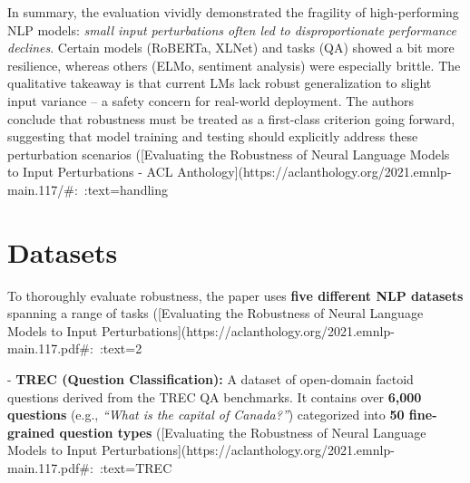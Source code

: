 In summary, the evaluation vividly demonstrated the fragility of high-performing NLP models: \textit{small input perturbations often led to disproportionate performance declines}. Certain models (RoBERTa, XLNet) and tasks (QA) showed a bit more resilience, whereas others (ELMo, sentiment analysis) were especially brittle. The qualitative takeaway is that current LMs lack robust generalization to slight input variance – a safety concern for real-world deployment. The authors conclude that robustness must be treated as a first-class criterion going forward, suggesting that model training and testing should explicitly address these perturbation scenarios ([Evaluating the Robustness of Neural Language Models to Input Perturbations - ACL Anthology](https://aclanthology.org/2021.emnlp-main.117/#:~:text=handling%

\section{Datasets}
To thoroughly evaluate robustness, the paper uses \textbf{five different NLP datasets} spanning a range of tasks ([Evaluating the Robustness of Neural Language Models to Input Perturbations](https://aclanthology.org/2021.emnlp-main.117.pdf#:~:text=2%

- \textbf{TREC (Question Classification):} A dataset of open-domain factoid questions derived from the TREC QA benchmarks. It contains over \textbf{6,000 questions} (e.g., \textit{“What is the capital of Canada?”}) categorized into \textbf{50 fine-grained question types} ([Evaluating the Robustness of Neural Language Models to Input Perturbations](https://aclanthology.org/2021.emnlp-main.117.pdf#:~:text=TREC%

